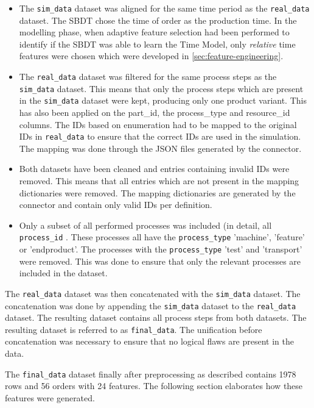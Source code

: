 \begin{itemize}
  \item The \texttt{sim\_data} dataset was aligned for the same time period as the \texttt{real\_data} dataset. The SBDT chose the time of order as the production time. In the modelling phase, when adaptive feature selection had been performed to identify if the SBDT was able to learn the Time Model, only \textit{relative} time features were chosen which were developed in \autoref{sec:feature-engineering}.
  \item The \texttt{real\_data} dataset was filtered for the same process steps as the \texttt{sim\_data} dataset. This means that only the process steps which are present in the \texttt{sim\_data} dataset were kept, producing only one product variant. This has also been applied on the part_id, the process_type and resource_id columns. The IDs based on enumeration had to be mapped to the original IDs in \texttt{real\_data} to ensure that the correct IDs are used in the simulation. The mapping was done through the JSON files generated by the connector.
  \item Both datasets have been cleaned and entries containing invalid IDs were removed. This means that all entries which are not present in the mapping dictionaries were removed. The mapping dictionaries are generated by the connector and contain only valid IDs per definition.
  \item Only a subset of all performed processes was included (in detail, all \texttt{process\_id} . These processes all have the \texttt{process\_type} 'machine', 'feature' or 'endproduct'. The processes with the \texttt{process\_type} 'test' and 'transport' were removed. This was done to ensure that only the relevant processes are included in the dataset.
\end{itemize}

The \texttt{real\_data} dataset was then concatenated with the \texttt{sim\_data} dataset. The concatenation was done by appending the \texttt{sim\_data} dataset to the \texttt{real\_data} dataset. The resulting dataset contains all process steps from both datasets. The resulting dataset is referred to as \texttt{final\_data}. The unification before concatenation was necessary to ensure that no logical flaws are present in the data.

The \texttt{final\_data} dataset finally after preprocessing as described contains 1978 rows and 56 orders with 24 features. The following section elaborates how these features were generated.

